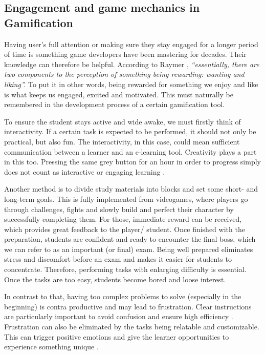 \documentclass[10pt,english,a4paper]{article}
\begin{document}
\subsection{Engagement and game mechanics in Gamification} \label{section3.1}
	Having user’s full attention or making sure they stay engaged for a longer period of time is something game developers have been mastering for decades. 
	Their knowledge can therefore be helpful. 
	According to Raymer \cite{Raymer}, \textit{“essentially, there are two components to the perception of something being rewarding: wanting and liking”.} 
	To put it in other words, being rewarded for something we enjoy and like is what keeps us engaged, excited and motivated. 
	This must naturally be remembered in the development process of a certain gamification tool.

	To ensure the student stays active and wide awake, we must firstly think of interactivity. 
	If a certain task is expected to be performed, it should not only be practical, but also fun. 
	The interactivity, in this case, could mean sufficient communication between a learner and an e-learning tool. 
	Creativity plays a part in this too. Pressing the same grey button for an hour in order to progress simply does not count as interactive or engaging learning \cite{ AL-Smadi}. 
	
	Another method is to divide study materials into blocks and set some short- and long-term goals. 
	This is fully implemented from videogames, where players go through challenges, fights and slowly build and perfect their character by successfully completing them.
	For those, immediate reward can be received, which provides great feedback to the player/ student.
	Once finished with the preparation, students are confident and ready to encounter the final boss, which we can refer to as an important (or final) exam. 
	Being well prepared eliminates stress and discomfort before an exam and makes it easier for students to concentrate.
	Therefore, performing tasks with enlarging difficulty is essential. Once the tasks are too easy, students become bored and loose interest. 

	In contrast to that, having too complex problems to solve (especially in the beginning) is contra productive and may lead to frustration. 
	Clear instructions are particularly important to avoid confusion and ensure high efficiency \cite{Raymer}. 
	Frustration can also be eliminated by the tasks being relatable and customizable. 
	This can trigger positive emotions and give the learner opportunities to experience something unique \cite{ AL-Smadi}.
	
\end{document}
